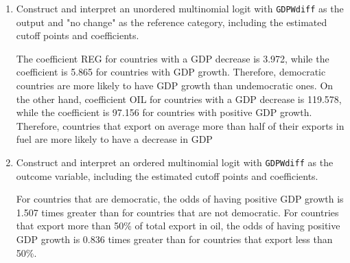 \documentclass[12pt,letterpaper]{article}
\begin{document}
\begin{enumerate}
	\item Construct and interpret an unordered multinomial logit with \texttt{GDPWdiff} as the output and "no change" as the reference category, including the estimated cutoff points and coefficients.
				  
	
	The coefficient REG for countries with a GDP decrease is 3.972, while the coefficient is 5.865 for countries with GDP growth. Therefore, democratic countries are more likely to have GDP growth than undemocratic ones. On the other hand, coefficient OIL for countries with a GDP decrease is 119.578, while the coefficient is 97.156 for countries with positive GDP growth. Therefore, countries that export on average more than half of their exports in fuel are more likely to have a decrease in GDP
	
	\item Construct and interpret an ordered multinomial logit with \texttt{GDPWdiff} as the outcome variable, including the estimated cutoff points and coefficients.
				  
				
	For countries that are democratic, the odds of having positive GDP growth is 1.507 times greater than for countries that are not democratic. For countries that export more than 50\% of total export in oil, the odds of having positive GDP growth is 0.836 times greater than for countries that export less than 50\%.
				
				
				
	
	
\end{enumerate}
\end{document}

